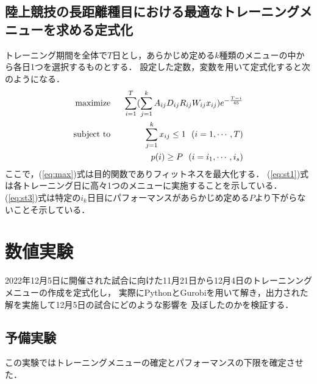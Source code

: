 \documentclass[12pt,fleqn]{jreport}
\begin{document}
\section{陸上競技の長距離種目における最適なトレーニングメニューを求める定式化}
トレーニング期間を全体で$T$日とし，あらかじめ定める$k$種類のメニューの中から各日1つを選択するものとする．
設定した定数，変数を用いて定式化すると次のようになる．
\vspace{1cm}
\begin{eqnarray}
  \mathop{\rm maximize}&\ \ &\sum_{i=1}^T (\sum_{j=1}^k A_{ij}D_{ij}R_{ij}W_{ij}x_{ij})e^{-\frac{T-i}{45}}\label{eq:max}\\%
  \mathop{\rm subject\ to}&\ \ &\sum_{j=1}^k x_{ij}\leq 1\ \ (i=1,\cdots , T)\label{eq:st1}\\%
  &&p(i)\geq P\ \ (i=i_1,\cdots , i_s)\label{eq:st3}%
\end{eqnarray}
\vspace{1cm}
ここで，(\ref{eq:max})式は目的関数でありフィットネスを最大化する．
(\ref{eq:st1})式は各トレーニング日に高々1つのメニューに実施することを示している．
(\ref{eq:st3})式は特定の$i_k$日目にパフォーマンスがあらかじめ定める$P$より下がらないことそ示している．
\newpage
\chapter {数値実験}
\vspace{1cm}
2022年12月5日に開催された試合に向けた11月21日から12月4日のトレーニンングメニューの作成を定式化し，
実際にPythonとGurobiを用いて解き，出力された解を実施して12月5日の試合にどのような影響を
及ぼしたのかを検証する．
\section{予備実験}
この実験ではトレーニングメニューの確定とパフォーマンスの下限を確定させた．
\end{document}
